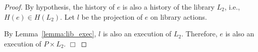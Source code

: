 \begin{proof}
  By hypothesis, the history of $e$ is also a history of the library $L_2$,
  i.e., $H(e)\in H(L_2)$. Let $l$ be the projection of $e$ on library actions.

 
  By Lemma~\ref{lemma:lib_exec}, $l$ is also an execution of $L_2$. Therefore,
  $e$ is also an execution of $P\times L_2$. \hfill $\Box$


\end{proof}

